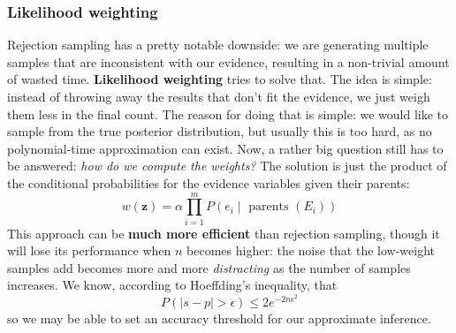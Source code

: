 \subsubsection{Likelihood weighting}
Rejection sampling has a pretty notable downside: we are generating multiple samples that are inconsistent with our evidence, resulting in a non-trivial amount of wasted time. \textbf{Likelihood weighting} tries to solve that. The idea is simple: instead of throwing away the results that don't fit the evidence, we just weigh them less in the final count. The reason for doing that is simple: we would like to sample from the true posterior distribution, but usually this is too hard, as no polynomial-time approximation can exist. Now, a rather big question still has to be answered: \textit{how do we compute the weights?} The solution is just the product of the conditional probabilities for the evidence variables given their parents:
\begin{equation}
    w(\mathbf{z})=\alpha \prod_{i=1}^{m} P\left(e_{i} \mid \text { parents }\left(E_{i}\right)\right)
\end{equation}
This approach can be \textbf{much more efficient} than rejection sampling, though it will lose its performance when $n$ becomes higher: the noise that the low-weight samples add becomes more and more \textit{distracting} as the number of samples increases. We know, according to Hoeffding's inequality, that 
\begin{equation}
    P(|s-p|>\epsilon) \leq 2 e^{-2 n \epsilon^{2}}
\end{equation}
so we may be able to set an accuracy threshold for our approximate inference.
